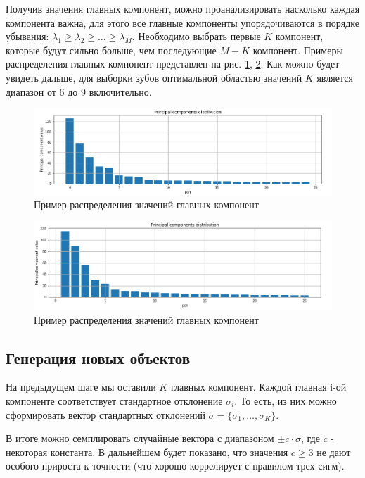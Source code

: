 

Получив значения главных компонент, можно проанализировать насколько каждая компонента важна, для этого все главные компоненты упорядочиваются в порядке убывания: $\lambda_{1} \ge \lambda_{2} \ge \dots \ge \lambda_{M}$.
Необходимо выбрать первые $K$ компонент, которые будут сильно больше, чем последующие $M - K$ компонент. Примеры распределения главных компонент представлен на рис. \ref{fig:pcd-ex-1}, \ref{fig:pcd-ex-2}. Как можно будет увидеть дальше, для выборки зубов 
оптимальной областью значений $K$ является диапазон от 6 до 9 включительно.

\begin{figure}[ht!]
    \includegraphics[width=1\linewidth]{images/pcd-example-1.png}
	\caption{Пример распределения значений главных компонент}
    \label{fig:pcd-ex-1}
\end{figure}

\begin{figure}[ht!]
    \includegraphics[width=1\linewidth]{images/pcd-example-2.png}
	\caption{Пример распределения значений главных компонент}
    \label{fig:pcd-ex-2}
\end{figure}


\subsection{Генерация новых объектов} \label{section:algorithm:generation}

На предыдущем шаге мы оставили $K$ главных компонент. Каждой главная i-ой компоненте соответствует стандартное отклонение $\sigma_{i}$. То есть, из них можно сформировать вектор стандартных отклонений $\overline{\sigma} = \{\sigma_{1}, \dots, \sigma_{K}\}$. 


В итоге можно семплировать случайные вектора с диапазоном $\pm c \cdot \overline{\sigma}$, где $c$ - некоторая константа. В дальнейшем будет показано, что значения $c \ge 3$ не дают особого прироста к точности (что хорошо коррелирует с правилом трех сигм).


